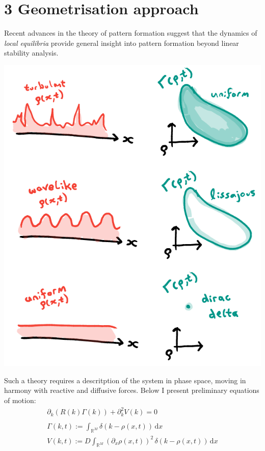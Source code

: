 \documentclass[a0,portrait]{a0poster}
\begin{document}
\section*{3 Geometrisation approach}
Recent advances in the theory of pattern formation \cite{Halatek2018} suggest that
the dynamics of \textit{local equilibria} provide general insight into pattern
formation beyond linear stability analysis.
\begin{center}
\includegraphics[width=0.99\linewidth]{motivation}
\end{center}
Such a theory requires a descritption of the system in phase space, moving in
harmony with reactive and diffusive forces. Below I present preliminary equations
of motion:\medbreak
\large\begin{align*}
	\partial_k\left(R(k)\Gamma(k)\right)+\partial_k^2 V(k)=0\qquad\quad
	\\\\
	\Gamma(k,t):=\int_{\mathbb{R}^M}\!\delta(k-\rho(x,t))\,\mathrm{d}x\qquad\quad
	\\
	V(k,t):=D\int_{\mathbb{R}^M}\!
		(\partial_x\rho(x,t))^2\,\delta(k-\rho(x,t))\,\mathrm{d}x
\end{align*}
\end{document}
